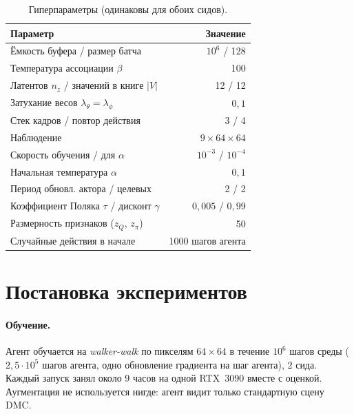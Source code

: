 \documentclass{article}
\theoremstyle{plain}
\theoremstyle{definition}
\theoremstyle{remark}
\begin{document}
\begin{table}[t]
\caption{Гиперпараметры (одинаковы для обоих сидов).}
\label{tab:hparams}
\vskip 0.1in
\begin{center}
\begin{small}
\begin{tabular}{lr}
\toprule
Параметр & Значение \\
\midrule
Ёмкость буфера / размер батча & $10^6$ / 128 \\
Температура ассоциации $\beta$ & 100 \\
Латентов $n_z$ / значений в книге $|V|$ & 12 / 12 \\
Затухание весов $\lambda_\theta{=}\lambda_\phi$ & $0,1$ \\
Стек кадров / повтор действия & 3 / 4 \\
Наблюдение & $9\times64\times64$ \\
Скорость обучения / для $\alpha$ & $10^{-3}$ / $10^{-4}$ \\
Начальная температура $\alpha$ & $0,1$ \\
Период обновл. актора / целевых & 2 / 2 \\
Коэффициент Поляка $\tau$ / дисконт $\gamma$ & $0,005$ / $0,99$ \\
Размерность признаков ($z_Q$, $z_\pi$) & 50 \\
Случайные действия в начале & 1000 шагов агента \\
\bottomrule
\end{tabular}
\end{small}
\end{center}
\vskip -0.1in
\end{table}

\section{Постановка экспериментов}
\label{sec:setup}

\paragraph{Обучение.} Агент обучается на \emph{walker-walk} по пикселям
$64{\times}64$ в течение $10^6$ шагов среды ($2,5{\cdot}10^5$ шагов агента,
одно обновление градиента на шаг агента), 2 сида. Каждый запуск занял около
9 часов на одной RTX~3090 вместе с оценкой. Аугментация не используется
нигде: агент видит только стандартную сцену DMC.
\end{document}
